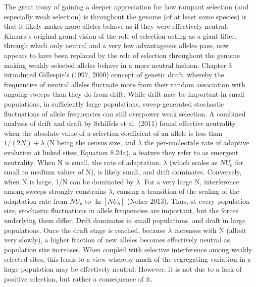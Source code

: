 \documentclass{article}
\begin{document}
The great irony of gaining a deeper appreciation for how rampant selection (and especially weak selection) is throughout the genome (of at least some species) is that it likely makes more alleles behave as if they were effectively neutral. Kimura's original grand vision of the role of selection acting as a giant filter, through which only neutral and a very few advantageous alleles pass, now appears to have been replaced by the role of selection throughout the genome making weakly selected alleles behave in a more neutral fashion. Chapter 3 introduced Gillespie's (1997, 2000) concept of genetic draft, whereby the frequencies of neutral alleles fluctuate more from their random association with ongoing sweeps than they do from drift. While drift may be important in small populations, in sufficiently large populations, sweep-generated stochastic fluctuations of allele frequencies can still overpower weak selection. A combined analysis of drift and draft by Schiffels et al. (2011) found effective neutrality when the absolute value of a selection coefficient of an allele is less than  $ 1/(2N) + \lambda $ (N being the census size, and  $ \lambda $ the per-nucleotide rate of adaptive evolution at linked sites; Equation 8.24a), a feature they refer to as emergent neutrality. When N is small, the rate of adaptation,  $ \lambda $ (which scales as  $ NU_b $ for small to medium values of N), is likely small, and drift dominates. Conversely, when N is large, 1/N can be dominated by  $ \lambda $. For a very large N, interference among sweeps strongly constrains  $ \lambda $, causing a transition of the scaling of the adaptation rate from  $ NU_b $ to  $ \ln[NU_b] $ (Neher 2013). Thus, at every population size, stochastic fluctuations in allele frequencies are important, but the forces underlying them differ. Drift dominates in small populations, and draft in large populations. Once the draft stage is reached, because  $ \lambda $ increases with N (albeit very slowly), a higher fraction of new alleles becomes effectively neutral as population size increases. When coupled with selective interference among weakly selected sites, this leads to a view whereby much of the segregating variation in a large population may be effectively neutral. However, it is not due to a lack of positive selection, but rather a consequence of it.
\end{document}
